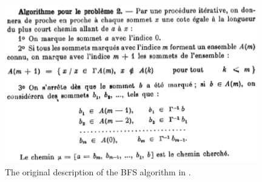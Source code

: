 \documentclass[a4paper]{book}
\theoremstyle{changebreak}                %
\begin{document}
\begin{figure}[!ht]
\begin{center}
\includegraphics[width=11cm]{berge-alg}
\end{center}
\caption{The original description of the BFS algorithm in
  \cite{bergebook2}.}
\label{f:bergebfs}
\end{figure}
\end{document}
